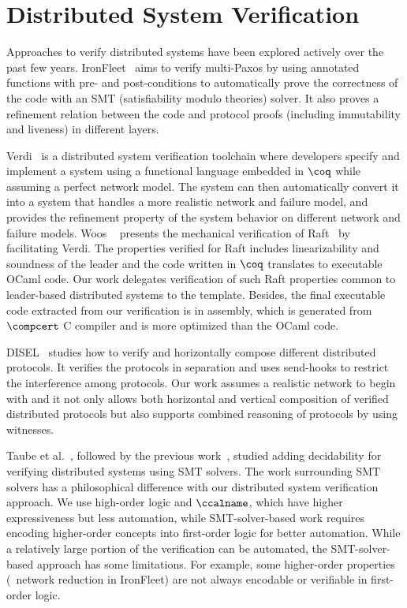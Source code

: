 \section{Distributed System Verification}
\label{chatper:related:sec:distributed-system-verification}

Approaches to verify distributed systems have been explored actively over the
past few years. 
IronFleet~\cite{ironfleet} aims to verify multi-Paxos by using annotated functions with pre- and
post-conditions to automatically prove the correctness of the code with an SMT (satisfiability
modulo theories) solver.
It also proves a refinement relation between the code and
protocol proofs (including immutability and liveness) in different layers. 

Verdi~\cite{verdi} is a distributed system verification toolchain
where developers specify and implement a system using a functional language
embedded in $\coq$ while assuming a perfect network model. 
The system can then automatically convert
it into a system that handles a more realistic network and failure model,
and provides the refinement property of the system behavior on different network and failure models.
Woos \etal~ presents the mechanical verification of Raft~\cite{cppraft} by facilitating Verdi. The properties
verified for Raft includes linearizability and soundness of the leader and
the code written in $\coq$ translates to executable OCaml code. 
Our work delegates verification of such Raft properties common to leader-based distributed systems to the template.
Besides, the final executable code extracted from
our verification is in assembly, which is generated from $\compcert$ C compiler and is more
optimized than the OCaml code.


DISEL~\cite{disel}
studies how to verify and horizontally compose different distributed protocols.
It verifies the protocols in separation and uses send-hooks to restrict the
interference among protocols. Our work assumes a realistic network to begin with
and it not only allows both horizontal and vertical composition of verified distributed
protocols but also supports combined reasoning of protocols by using witnesses.

Taube et al.~\cite{modular}, followed by the previous work~\cite{paxosepr}, studied adding
decidability for verifying distributed systems using SMT solvers.
The work surrounding SMT solvers has a philosophical difference with our distributed system verification approach.
We use high-order logic and $\ccalname$, which have higher expressiveness but less automation,
while SMT-solver-based work requires encoding higher-order concepts into
first-order logic for better automation. While a relatively large portion of the
verification can be automated, the SMT-solver-based approach has some limitations.
For example, some higher-order properties (\eg~network reduction
in IronFleet) are not always encodable or verifiable in first-order logic.

